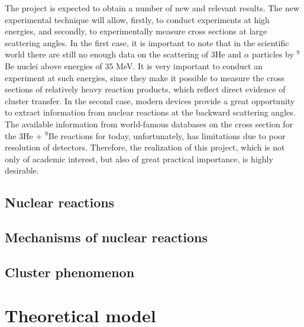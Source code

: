 \documentclass[
12pt, %
oneside, %
english, %
onehalfspacing, %
headsepline, %
]{MastersDoctoralThesis} %
\begin{document}
The project is expected to obtain a number of new and relevant results. The new experimental technique will allow, firstly, to conduct experiments at high energies, and secondly, to experimentally measure cross sections at large scattering angles. In the first case, it is important to note that in the scientific world there are still no enough data on the scattering of 3He and $\alpha$ particles by $^{9}$Be nuclei above energies of 35 MeV. It is very important to conduct an experiment at such energies, since they make it possible to measure the cross sections of relatively heavy reaction products, which reflect direct evidence of cluster transfer. In the second case, modern devices provide a great opportunity to extract information from nuclear reactions at the backward scattering angles. The available information from world-famous databases on the cross section for the 3He + $^{9}$Be reactions for today, unfortunately, has limitations due to poor resolution of detectors. Therefore, the realization of this project, which is not only of academic interest, but also of great practical importance, is highly desirable.

\label{Chapter1} %


\newcommand{\keyword}[1]{\textbf{#1}}
\newcommand{\tabhead}[1]{\textbf{#1}}
\newcommand{\code}[1]{\texttt{#1}}
\newcommand{\file}[1]{\texttt{\bfseries#1}}
\newcommand{\option}[1]{\texttt{\itshape#1}}


\section*{Nuclear reactions}

\section*{Mechanisms of nuclear reactions}
\section*{Cluster phenomenon}



\chapter{Theoretical model} %
\end{document}
